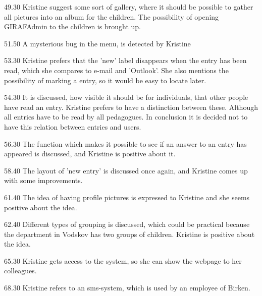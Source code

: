 49.30
Kristine suggest some sort of gallery, where it should be possible to gather all pictures into an album for the children. The possibility of opening GIRAFAdmin to the children is brought up.

51.50
A mysterious bug in the menu, is detected by Kristine

53.30
Kristine prefers that the 'new' label disappears when the entry has been read, which she compares to e-mail and 'Outlook'. She also mentions the possibility of marking a entry, so it would be easy to locate later.

54.30
It is discussed, how visible it should be for individuals, that other people have read an entry. Kristine prefers to have a distinction between these. Although all entries have to be read by all pedagogues. In conclusion it is decided not to have this relation between entries and users.

56.30
The function which makes it possible to see if an answer to an entry has appeared is discussed, and Kristine is positive about it.

58.40
The layout of 'new entry' is discussed once again, and Kristine comes up with some improvements.

61.40
The idea of having profile pictures is expressed to Kristine and she seems positive about the idea.

62.40
Different types of grouping is discussed, which could be practical because the department in Vodskov has two groups of children. Kristine is positive about the idea.

65.30
Kristine gets access to the system, so she can show the webpage to her colleagues.

68.30
Kristine refers to an sms-system, which is used by an employee of Birken. 